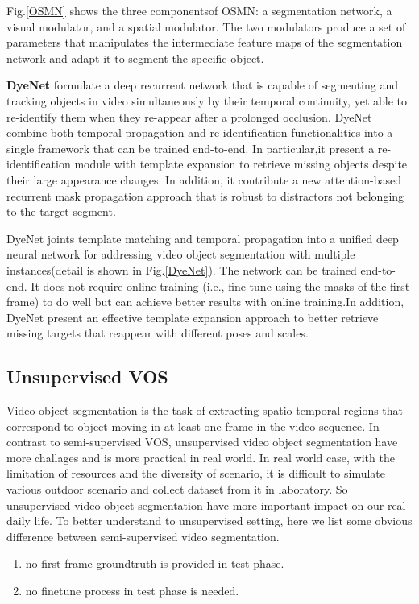 Fig.\ref{OSMN} shows the three componentsof OSMN: a segmentation network, a visual modulator, and a spatial modulator. The two modulators produce a set of parameters that manipulates the intermediate feature maps of the segmentation network and adapt it to segment the specific object.


\textbf{DyeNet}\cite{DyeNet} formulate a deep recurrent network that is capable of segmenting and tracking objects in video simultaneously by their temporal continuity, yet able to re-identify them when they re-appear after a prolonged occlusion. DyeNet combine both temporal propagation and re-identification functionalities into a single framework that can be trained end-to-end. In particular,it present a re-identification module with template expansion to retrieve missing objects despite their large appearance changes. In addition, it contribute a new attention-based recurrent mask propagation approach that is robust to distractors not belonging to the target segment.



DyeNet joints template matching and temporal propagation into a unified deep neural network for addressing video object segmentation with multiple instances(detail is shown in Fig.\ref{DyeNet}). The network can be trained end-to-end. It does not require online training (i.e., fine-tune using the masks of the first frame) to do well but can achieve better results with online training.In addition, DyeNet present an effective template expansion approach to better retrieve missing targets that reappear with different poses and scales.




\subsection{Unsupervised VOS}
Video object segmentation is the task of extracting spatio-temporal regions that correspond to object moving in at
least one frame in the video sequence. In contrast to semi-supervised VOS, unsupervised video object segmentation have 
more challages and is more practical in real world. In real world case, with the limitation of resources and the diversity of scenario,
it is difficult to simulate various outdoor scenario and collect dataset from it in laboratory. So unsupervised video object 
segmentation have more important impact on our real daily life. To better understand to unsupervised setting, here we list some
obvious difference between semi-supervised video segmentation.
\begin{enumerate}
    \item no first frame groundtruth is provided in test phase.
    \item no finetune process in test phase is needed.
\end{enumerate}

